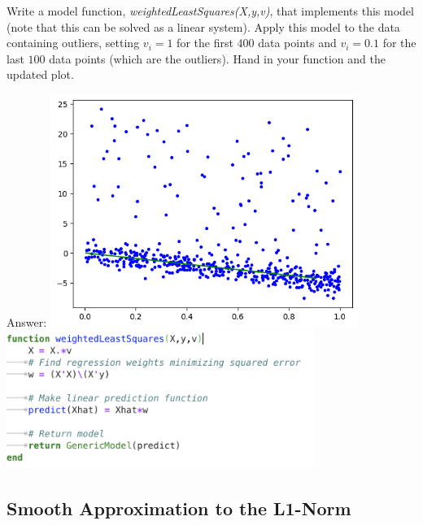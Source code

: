\documentclass{article}
\def\ans#1{\par\gre{Answer: #1}}
\def\blu#1{{\color{blu}#1}}
\def\gre#1{{\color{gre}#1}}
\begin{document}
Write a model function, \emph{weightedLeastSquares(X,y,v)}, that implements this model (note that this can be solved as a linear system).
Apply this model to the data containing outliers, setting $v_i = 1$ for the first $400$ data points and $v_i = 0.1$ for the last $100$ data points (which are the outliers). \blu{Hand in your function and the updated plot}.
\ans{
    \includegraphics[width=10cm]{Q41plot.png}\\
    \includegraphics[width=10cm]{Q41Code.png}
}

\subsection{Smooth Approximation to the L1-Norm}
\end{document}
